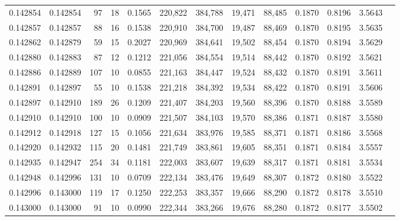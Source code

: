 \begin{tabular}{rrrrrrrrrrrrr}
0.142854 & 0.142854 &    97 &  18 &                                     0.1565 & 220,822 & 384,788 &  19,471 &  88,485 & 0.1870 & 0.8196 & 3.5643 \\
0.142857 & 0.142857 &    88 &  16 &                                     0.1538 & 220,910 & 384,700 &  19,487 &  88,469 & 0.1870 & 0.8195 & 3.5635 \\
0.142862 & 0.142879 &    59 &  15 &                                     0.2027 & 220,969 & 384,641 &  19,502 &  88,454 & 0.1870 & 0.8194 & 3.5629 \\
0.142880 & 0.142883 &    87 &  12 &                                     0.1212 & 221,056 & 384,554 &  19,514 &  88,442 & 0.1870 & 0.8192 & 3.5621 \\
0.142886 & 0.142889 &   107 &  10 &                                     0.0855 & 221,163 & 384,447 &  19,524 &  88,432 & 0.1870 & 0.8191 & 3.5611 \\
0.142891 & 0.142897 &    55 &  10 &                                     0.1538 & 221,218 & 384,392 &  19,534 &  88,422 & 0.1870 & 0.8191 & 3.5606 \\
0.142897 & 0.142910 &   189 &  26 &                                     0.1209 & 221,407 & 384,203 &  19,560 &  88,396 & 0.1870 & 0.8188 & 3.5589 \\
0.142910 & 0.142910 &   100 &  10 &                                     0.0909 & 221,507 & 384,103 &  19,570 &  88,386 & 0.1871 & 0.8187 & 3.5580 \\
0.142912 & 0.142918 &   127 &  15 &                                     0.1056 & 221,634 & 383,976 &  19,585 &  88,371 & 0.1871 & 0.8186 & 3.5568 \\
0.142920 & 0.142932 &   115 &  20 &                                     0.1481 & 221,749 & 383,861 &  19,605 &  88,351 & 0.1871 & 0.8184 & 3.5557 \\
0.142935 & 0.142947 &   254 &  34 &                                     0.1181 & 222,003 & 383,607 &  19,639 &  88,317 & 0.1871 & 0.8181 & 3.5534 \\
0.142948 & 0.142996 &   131 &  10 &                                     0.0709 & 222,134 & 383,476 &  19,649 &  88,307 & 0.1872 & 0.8180 & 3.5522 \\
0.142996 & 0.143000 &   119 &  17 &                                     0.1250 & 222,253 & 383,357 &  19,666 &  88,290 & 0.1872 & 0.8178 & 3.5510 \\
0.143000 & 0.143000 &    91 &  10 &                                     0.0990 & 222,344 & 383,266 &  19,676 &  88,280 & 0.1872 & 0.8177 & 3.5502 \\

\end{tabular}
